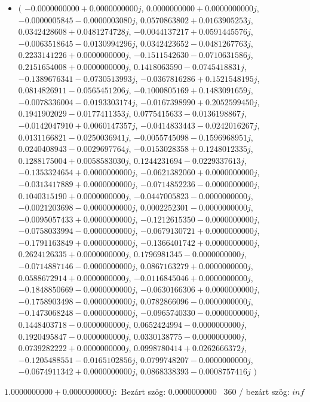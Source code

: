 \documentclass[14pt,a4paper]{article}
\begin{document}
\begin{itemize}
\item
$\big($
$-0.0000000000+0.0000000000j$, $0.0000000000+0.0000000000j$, $-0.0000005845-0.0000003080j$, $0.0570863802+0.0163905253j$, $0.0342428608+0.0481274728j$, $-0.0044137217+0.0591445576j$, $-0.0063518645-0.0130994296j$, $0.0342423652-0.0481267763j$, $0.2233141226+0.0000000000j$, $-0.1511542630-0.0710631586j$, $0.2151654008+0.0000000000j$, $0.1418063590-0.0745418831j$, $-0.1389676341-0.0730513993j$, $-0.0367816286+0.1521548195j$, $0.0814826911-0.0565451206j$, $-0.1000805169+0.1483091659j$, $-0.0078336004-0.0193303174j$, $-0.0167398990+0.2052599450j$, $0.1941902029-0.0177411353j$, $0.0775415633-0.0136198867j$, $-0.0142047910+0.0060147357j$, $-0.0414833443-0.0242016267j$, $0.0131166821-0.0250036941j$, $-0.0055745098-0.1596968951j$, $0.0240408943-0.0029697764j$, $-0.0153028358+0.1248012335j$, $0.1288175004+0.0058583030j$, $0.1244231694-0.0229337613j$, $-0.1353324654+0.0000000000j$, $-0.0621382060+0.0000000000j$, $-0.0313417889+0.0000000000j$, $-0.0714852236-0.0000000000j$, $0.1040315190+0.0000000000j$, $-0.0447005823-0.0000000000j$, $-0.0021203698-0.0000000000j$, $0.0002252301-0.0000000000j$, $-0.0095057433+0.0000000000j$, $-0.1212615350-0.0000000000j$, $-0.0758033994-0.0000000000j$, $-0.0679130721+0.0000000000j$, $-0.1791163849+0.0000000000j$, $-0.1366401742+0.0000000000j$, $0.2624126335+0.0000000000j$, $0.1796981345-0.0000000000j$, $-0.0714887146-0.0000000000j$, $0.0867163279+0.0000000000j$, $0.0588672914+0.0000000000j$, $-0.0116845046+0.0000000000j$, $-0.1848850669-0.0000000000j$, $-0.0630166306+0.0000000000j$, $-0.1758903498-0.0000000000j$, $0.0782866096-0.0000000000j$, $-0.1473068248-0.0000000000j$, $-0.0965740330-0.0000000000j$, $0.1448403718-0.0000000000j$, $0.0652424994-0.0000000000j$, $0.1920495847-0.0000000000j$, $0.0330138775-0.0000000000j$, $0.0739282222+0.0000000000j$, $0.0998780414+0.0262666372j$, $-0.1205488551-0.0165102856j$, $0.0799748207-0.0000000000j$, $-0.0674911342+0.0000000000j$, $0.0868338393-0.0008757416j$
$\big)$
\end{itemize}
$1.0000000000+0.0000000000j$:\
Bezárt szög: $0.0000000000$ \
360 / bezárt szög: $inf$\
\end{document}
